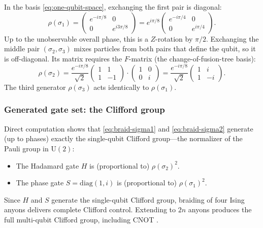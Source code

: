 In the basis \eqref{eq:one-qubit-space}, exchanging the first pair is diagonal:
\begin{equation}
  \rho(\sigma_1) = \begin{pmatrix}
    e^{-i\pi/8} & 0 \\ 0 & e^{i3\pi/8}
  \end{pmatrix}
  = e^{i\pi/8}\begin{pmatrix}
    e^{-i\pi/4} & 0 \\ 0 & e^{i\pi/4}
  \end{pmatrix}.
  \label{eq:braid-sigma1}
\end{equation}
Up to the unobservable overall phase, this is a $Z$-rotation by $\pi/2$.  Exchanging the middle pair $(\sigma_2, \sigma_3)$ mixes particles from both pairs that define the qubit, so it is off-diagonal.  Its matrix requires the $F$-matrix (the change-of-fusion-tree basis):
\begin{equation}
  \rho(\sigma_2) = \frac{e^{-i\pi/8}}{\sqrt{2}}
  \begin{pmatrix} 1 & 1 \\ 1 & -1 \end{pmatrix}
  \cdot
  \begin{pmatrix} 1 & 0 \\ 0 & i \end{pmatrix}
  = \frac{e^{-i\pi/8}}{\sqrt{2}}
  \begin{pmatrix} 1 & i \\ 1 & -i \end{pmatrix}.
  \label{eq:braid-sigma2}
\end{equation}
The third generator $\rho(\sigma_3)$ acts identically to $\rho(\sigma_1)$.

\subsubsection*{Generated gate set: the Clifford group}

Direct computation shows that \eqref{eq:braid-sigma1} and \eqref{eq:braid-sigma2} generate (up to phases) exactly the single-qubit Clifford group---the normalizer of the Pauli group in $\mathrm{U}(2)$:
\begin{itemize}
  \item The Hadamard gate $H$ is (proportional to) $\rho(\sigma_2)^2$.
  \item The phase gate $S = \mathrm{diag}(1, i)$ is (proportional to)
    $\rho(\sigma_1)^2$.
\end{itemize}
Since $H$ and $S$ generate the single-qubit Clifford group, braiding of four Ising anyons delivers complete Clifford control.  Extending to $2n$ anyons produces the full multi-qubit Clifford group, including CNOT \cite{NayakSimonSternFreedmanDasSarma2008NonabelianAnyons}.

